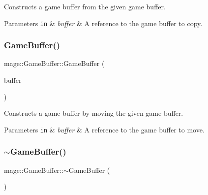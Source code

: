 Constructs a game buffer from the given game buffer.


\begin{DoxyParams}[1]{Parameters}
\mbox{\tt in}  & {\em buffer} & A reference to the game buffer to copy. \\
\hline
\end{DoxyParams}
\hypertarget{structmage_1_1_game_buffer_a012cbf18353f056094ebc27d19f93ad1}{}\label{structmage_1_1_game_buffer_a012cbf18353f056094ebc27d19f93ad1} 
\subsubsection{\texorpdfstring{Game\+Buffer()}{GameBuffer()}\hspace{0.1cm}{\footnotesize\ttfamily [3/3]}}
{\footnotesize\ttfamily mage\+::\+Game\+Buffer\+::\+Game\+Buffer (\begin{DoxyParamCaption}\item[{\hyperlink{structmage_1_1_game_buffer}{Game\+Buffer} \&\&}]{buffer }\end{DoxyParamCaption})\hspace{0.3cm}{\ttfamily [default]}}

Constructs a game buffer by moving the given game buffer.


\begin{DoxyParams}[1]{Parameters}
\mbox{\tt in}  & {\em buffer} & A reference to the game buffer to move. \\
\hline
\end{DoxyParams}
\hypertarget{structmage_1_1_game_buffer_ac1ae097a91a446184b71bb4dd9acf8b4}{}\label{structmage_1_1_game_buffer_ac1ae097a91a446184b71bb4dd9acf8b4} 
\subsubsection{\texorpdfstring{$\sim$\+Game\+Buffer()}{~GameBuffer()}}
{\footnotesize\ttfamily mage\+::\+Game\+Buffer\+::$\sim$\+Game\+Buffer (\begin{DoxyParamCaption}{ }\end{DoxyParamCaption})\hspace{0.3cm}{\ttfamily [default]}}

